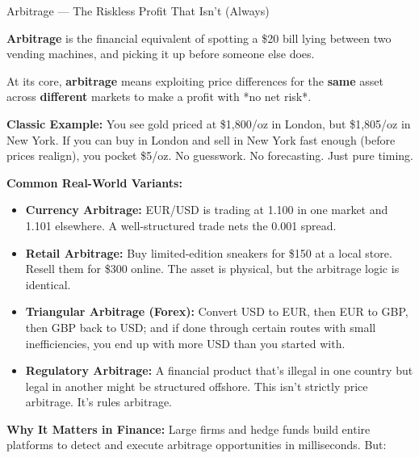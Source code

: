 \begin{TechnicalSidebar}{Arbitrage --- The Riskless Profit That Isn’t (Always)}

    \textbf{Arbitrage} is the financial equivalent of spotting a \$20 bill lying between two 
    vending machines, and picking it up before someone else does.

\medskip
    
    At its core, \textbf{arbitrage} means exploiting price differences for the \textbf{same} 
    asset across \textbf{different} markets to make a profit with *no net risk*.

\medskip
    
    \textbf{Classic Example:}  
    You see gold priced at \$1,800/oz in London, but \$1,805/oz in New York.  
    If you can buy in London and sell in New York fast enough (before prices realign), you pocket \$5/oz.  
    No guesswork. No forecasting. Just pure timing.

\medskip
    
    \textbf{Common Real-World Variants:}

\medskip

    \begin{itemize}
      \item \textbf{Currency Arbitrage:}  
      EUR/USD is trading at 1.100 in one market and 1.101 elsewhere. A well-structured trade nets 
      the 0.001 spread.
    
      \item \textbf{Retail Arbitrage:}  
      Buy limited-edition sneakers for \$150 at a local store. Resell them for \$300 online. The asset 
      is physical, but the arbitrage logic is identical.
    
      \item \textbf{Triangular Arbitrage (Forex):}  
      Convert USD to EUR, then EUR to GBP, then GBP back to USD; and if done through certain routes 
      with small inefficiencies, you end up with more USD than you started with. 
    
      \item \textbf{Regulatory Arbitrage:}  
      A financial product that's illegal in one country but legal in another might be structured offshore. 
      This isn't strictly price arbitrage. It's rules arbitrage.
    \end{itemize}
    
\medskip
    
    \textbf{Why It Matters in Finance:}  
    Large firms and hedge funds build entire platforms to detect and execute arbitrage opportunities in 
    milliseconds. But:
    

\end{TechnicalSidebar}
